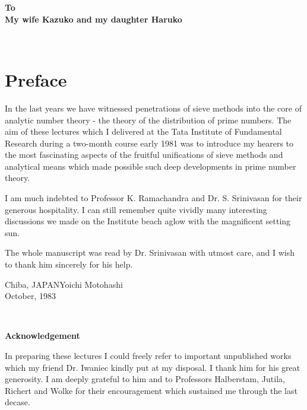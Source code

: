 \eject

\thispagestyle{empty}


\begin{center}
{\large\bf To}\\[15pt]
{\large\bf My wife Kazuko and my daughter Haruko}
\end{center}

\vfill\eject

~\phantom{a}
\thispagestyle{empty}


\chapter*{Preface}


In the last years we have witnessed penetrations of sieve methods into
the core of analytic number theory - the theory of the distribution of
prime numbers. The aim of these lectures which I delivered at the Tata
Institute of Fundamental Research during a two-month course early 1981
was to introduce my hearers to the most fascinating aspects of the
fruitful unifications of sieve methods and analytical means which made
possible such deep developments in prime number theory.

I am much indebted to Professor K. Ramachandra and Dr. S. Srinivasan
for their generous hospitality. I can still remember quite vividly
many interesting discussions we made on the Institute beach aglow with
the magnificent setting sun.

The whole manuscript was read by Dr. Srinivasan with utmost care, and
I wish to thank him sincerely for his help.

\vskip 1cm

\noindent
Chiba, JAPAN\hfill Yoichi Motohashi\\
October, 1983

\vfill\eject


~\phantom{a}
\thispagestyle{empty}

\begin{center}
{\large\bf Acknowledgement}
\end{center}
\bigskip

In preparing these lectures I could freely refer to important
unpublished works which my friend Dr. Iwaniec kindly put at my
disposal. I thank him for his great generosity. I am deeply grateful
to him and to Professors Halberstam, Jutila, Richert and Wolke for
their encouragement which sustained me through the last decase.

